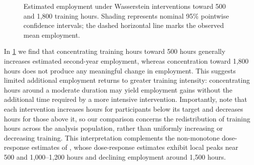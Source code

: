 \documentclass[11pt,twoside]{article}
\theoremstyle{definition}
\theoremstyle{remark}
\begin{document}
\begin{figure}[h]

    \caption{Estimated employment under Wasserstein interventions toward
    500 and 1,800 training hours. Shading represents nominal 95\% pointwise
    confidence intervals; the dashed horizontal line marks the observed
    mean employment.}
    \label{job-corps-incremental}
\end{figure}



In \cref{job-corps-incremental} we find that concentrating training hours toward 500 hours generally increases estimated second-year employment, whereas concentration toward 1,800 hours does not produce any meaningful change in employment. This suggests limited additional employment returns to greater training intensity: concentrating hours around a moderate duration may yield employment gains without the additional time required by a more intensive intervention. Importantly, note that each intervention increases hours for participants below its target and decreases hours for those above it, so our comparison concerns the redistribution of training hours across the analysis population, rather than uniformly increasing or decreasing training. This interpretation complements the non-monotone dose-response estimates of \cite{Colangelo02012026}, whose dose-response estimates exhibit local peaks near 500 and 1,000–1,200 hours and declining employment around 1,500 hours.
\end{document}
